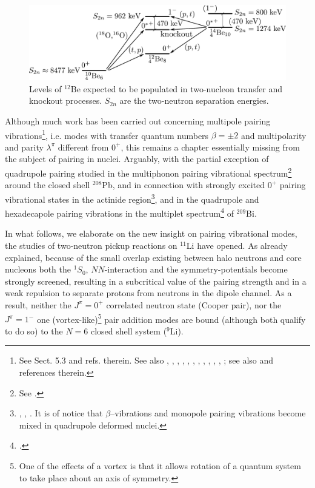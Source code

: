 \begin{subappendices}
\begin{figure}
\includegraphics[width=\textwidth]{C8/figsC8/figa4_newnew.pdf}
\caption{Levels of $^{12}$Be expected to be populated in two-nucleon transfer and knockout processes. $S_{2n}$ are the two-neutron separation energies.}\label{fig6.I.4}
\end{figure}




Although much work has been carried out concerning multipole pairing vibrations\footnote{See \cite{Brink:05} Sect. 5.3 and refs. therein. See also  \cite{Broglia:74}, \cite{Ragnarsson:76}, \cite{Broglia:71b}, \cite{Broglia:71c}, \cite{Bes:71d}, \cite{Bes:71}, \cite{Flynn:71}, \cite{Bes:72}, \cite{Broglia:81c}, \cite{Bohr:74b}, \cite{Flynn:72},  \cite{Bortignon:76}; see also \cite{Kubo:70} and references therein.}, i.e. modes with transfer quantum numbers $\beta=\pm2$ and multipolarity and parity $\lambda^\pi$ different from $0^+$, this remains a chapter essentially missing from the subject of pairing in nuclei. Arguably, with the partial exception of quadrupole pairing studied in the multiphonon pairing vibrational spectrum\footnote{See \cite{Flynn:72}.} around the closed shell $^{208}$Pb, and in connection with strongly excited $0^+$ pairing vibrational states in the actinide region\footnote{\cite{Casten:72}, \cite{Bes:72}, \cite{Ragnarsson:76}. It is of notice that $\beta$--vibrations and monopole pairing vibrations become mixed in quadrupole deformed nuclei.}, and in  the quadrupole and hexadecapole pairing vibrations in the multiplet spectrum\footnote{\cite{Bortignon:76}.} of $^{209}$Bi.

In what follows, we  elaborate on the new insight on pairing vibrational modes, the studies of two-neutron pickup reactions on $^{11}$Li have opened. As already explained, because of the small overlap existing between halo neutrons and core nucleons both the $^1S_0$, $NN$-interaction and the symmetry-potentials become strongly screened, resulting in a subcritical value of the pairing strength and in a weak repulsion to separate protons from neutrons in the dipole channel.
As a result, neither the $J^{\pi}=0^+$ correlated neutron state  (Cooper pair), nor the $J^\pi=1^-$ one (vortex-like)\footnote{One of the effects of a vortex is that it allows rotation of a quantum system to take place about an axis of symmetry.} pair addition modes are bound 
(although both qualify to do so) to the $N=6$ closed shell system ($^{9}$Li). 



\end{subappendices}
